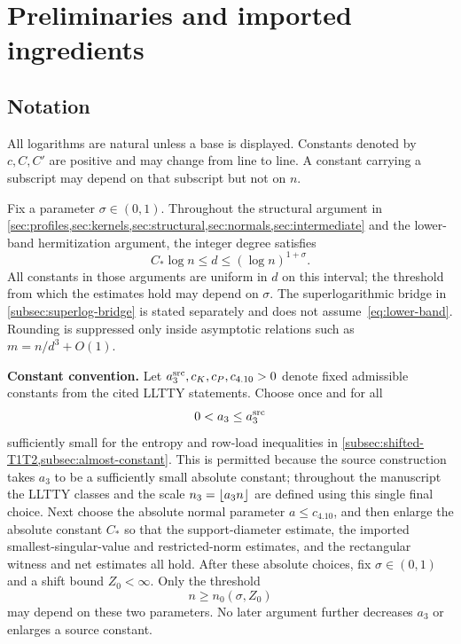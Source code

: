 \section{Preliminaries and imported ingredients}\label{sec:preliminaries}

\subsection{Notation}

All logarithms are natural unless a base is displayed. Constants denoted by $c,C,C'$ are positive and may change from line to line. A constant carrying a subscript may depend on that subscript but not on $n$.

Fix a parameter $\sigma\in(0,1)$. Throughout the structural argument in \cref{sec:profiles,sec:kernels,sec:structural,sec:normals,sec:intermediate} and the lower-band hermitization argument, the integer degree satisfies
\begin{equation}\label{eq:lower-band}
  C_*\log n\le d\le(\log n)^{1+\sigma}.
\end{equation}
All constants in those arguments are uniform in $d$ on this interval; the threshold from which the estimates hold may depend on $\sigma$. The superlogarithmic bridge in \cref{subsec:superlog-bridge} is stated separately and does not assume~\eqref{eq:lower-band}. Rounding is suppressed only inside asymptotic relations such as $m=n/d^3+O(1)$.

\medskip
\noindent\textbf{Constant convention.}
Let $a_3^{\mathrm{src}},c_K,c_P,c_{4.10}>0$ denote fixed admissible constants from the cited LLTTY statements. Choose once and for all
\[
  0<a_3\le a_3^{\mathrm{src}}
\]
sufficiently small for the entropy and row-load inequalities in \cref{subsec:shifted-T1T2,subsec:almost-constant}. This is permitted because the source construction takes $a_3$ to be a sufficiently small absolute constant; throughout the manuscript the LLTTY classes and the scale $n_3=\left\lfloor a_3n\right\rfloor$ are defined using this single final choice. Next choose the absolute normal parameter $a\le c_{4.10}$, and then enlarge the absolute constant $C_*$ so that the support-diameter estimate, the imported smallest-singular-value and restricted-norm estimates, and the rectangular witness and net estimates all hold. After these absolute choices, fix $\sigma\in(0,1)$ and a shift bound $Z_0<\infty$. Only the threshold
\[
  n\ge n_0(\sigma,Z_0)
\]
may depend on these two parameters. No later argument further decreases $a_3$ or enlarges a source constant.

